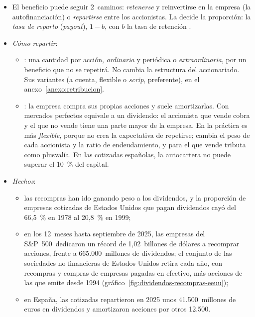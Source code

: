 \documentclass[11pt]{article}
\begin{document}
\begin{itemize}
\item El beneficio puede seguir 2~caminos: \emph{retenerse} y reinvertirse en la empresa (la autofinanciación) o \emph{repartirse} entre los accionistas. La  decide la proporción: la \emph{tasa de reparto} (\emph{payout}), $1-b$, con $b$ la tasa de retención .
\item \emph{Cómo repartir}:
  \begin{itemize}
  \item {}: una cantidad por acción, \emph{ordinaria} y periódica o \emph{extraordinaria}, por un beneficio que no se repetirá. No cambia la estructura del accionariado. Sus variantes (a cuenta, flexible o \emph{scrip}, preferente), en el anexo~\ref{anexo:retribucion}.
  \item {}: la empresa compra sus propias acciones y suele amortizarlas. Con mercados perfectos equivale a un dividendo: el accionista que vende cobra y el que no vende tiene una parte mayor de la empresa. En la práctica es más \emph{flexible}, porque no crea la expectativa de repetirse; cambia el peso de cada accionista y la ratio de endeudamiento, y para el que vende tributa como plusvalía. En las cotizadas españolas, la autocartera no puede superar el 10~\% del capital\nocite{LSC2010}.
  \end{itemize}
\item \emph{Hechos}:
  \begin{itemize}
  \item las recompras han ido ganando peso a los dividendos\nocite{GrullonMichaely2002Dividends}, y la proporción de empresas cotizadas de Estados Unidos que pagan dividendos cayó del 66,5~\% en 1978 al 20,8~\% en 1999\nocite{FamaFrench2001Disappearing};
  \item en los 12~meses hasta septiembre de 2025, las empresas del S\&P~500~dedicaron un récord de 1,02~billones de dólares a recomprar acciones, frente a 665.000~millones de dividendos\nocite{SPDJI2025Buybacks}; el conjunto de las sociedades no financieras de Estados Unidos retira cada año, con recompras y compras de empresas pagadas en efectivo, más acciones de las que emite desde 1994 (gráfico~\ref{fig:dividendos-recompras-eeuu});
  \item en España, las cotizadas repartieron en 2025 unos 41.500~millones de euros en dividendos y amortizaron acciones por otros 12.500\nocite{BME2026InformeMercado}.
  \end{itemize}
\end{itemize}
\end{document}

